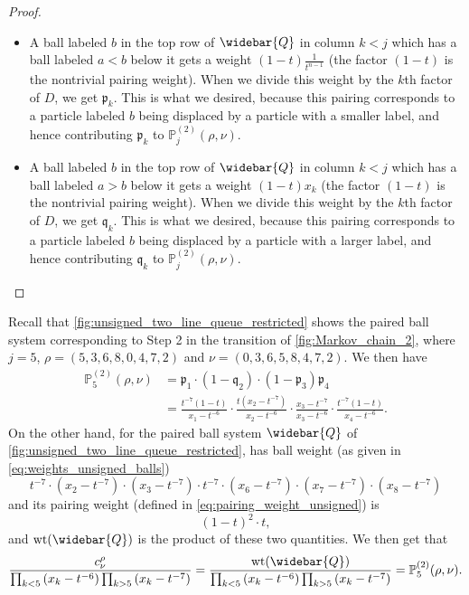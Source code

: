 \documentclass[12pt]{amsart}
\theoremstyle{definition}
\DeclareMathOperator{\wt}{wt}
\newcommand{\Qbar}{\widebar{Q}}
\newcommand{\PPtwo}[1]{\mathbb P^{(2)}_{#1}}
\newcommand{\mfp}{\mathfrak p}
\newcommand{\mfq}{\mathfrak q}
\begin{document}
\begin{proof}
\begin{itemize}
    $k$th factor of $D$, we get $1-\mfq_k$
    (see \eqref{eq:1minuspk}).
    This is what we desired, because such a trivial pairing corresponds to a particle labeled $b$ skipped over by a particle with a larger label, and hence contributes $1-\mfq_k$ to $\PPtwo{j}(\rho,\nu)$.
    \item A ball labeled $b$ in the top row of $\Qbar$ in column $k<j$ which has a ball labeled $a<b$ below it gets a weight $(1-t)\frac{1}{t^{n-1}}$    (the factor $(1-t)$ is the nontrivial pairing weight). When we divide this weight by the $k$th factor of $D$, we get $\mfp_k$.  This is what we desired, because this pairing corresponds to a particle labeled $b$ being displaced by a particle with a smaller label, and hence contributing $\mfp_k$ 
    to $\PPtwo{j}(\rho,\nu)$.
    \item A ball labeled $b$ in the top row of 
    $\Qbar$ in column $k<j$ which has a ball labeled $a>b$ below it gets a weight $(1-t)x_k$ (the factor $(1-t)$ is the nontrivial pairing weight). 
     When we divide this weight by the $k$th factor of $D$, we get $\mfq_k$.  This is what we desired, because this pairing
    corresponds to a particle labeled $b$ being displaced by a particle with a larger label, and hence contributing $\mfq_k$ to $\PPtwo{j}(\rho,\nu)$.\qedhere
\end{itemize}
\end{proof}


Recall that \cref{fig:unsigned_two_line_queue_restricted} shows the paired ball system corresponding to Step 2 in the transition of \cref{fig:Markov_chain_2}, where $j=5$, $\rho=(5,3,6,8,0,4,7,2)$ and $\nu=(0,3,6,5,8,4,7,2)$. We then have 
\begin{align*}
  \PPtwo{5}(\rho,\nu)&=\mfp_1\cdotp(1-\mfq_2)\cdotp(1-\mfp_3)\mfp_4\\
  &=\frac{t^{-7}(1-t)}{x_1-t^{-6}}\cdotp \frac{t (x_2-t^{-7})}{x_2-t^{-6}}\cdotp\frac{x_3-t^{-7}}{x_3-t^{-6}}\cdotp\frac{t^{-7}(1-t)}{x_4-t^{-6}}.
\end{align*}
On the other hand, for the paired ball system $\Qbar$ of \cref{fig:unsigned_two_line_queue_restricted}, has ball weight (as given in \cref{eq:weights_unsigned_balls}) 
$$t^{-7}\cdotp (x_2-t^{-7})\cdotp(x_3-t^{-7})\cdotp t^{-7}\cdotp (x_6-t^{-7})\cdotp (x_7-t^{-7}) \cdotp(x_8-t^{-7})$$
and its pairing weight (defined in \cref{eq:pairing_weight_unsigned}) is 
$$(1-t)^2\cdotp t,$$
and $\wt(\Qbar)$ is the product of these two quantities. We then get that
$$\frac{c^\rho_\nu}{\prod_{k<5}\left(x_k-t^{-6}\right)\prod_{k>5}\left(x_k-t^{-7}\right)}
=\frac{\wt(\Qbar)}{\prod_{k<5}\left(x_k-t^{-6}\right)\prod_{k>5}\left(x_k-t^{-7}\right)}=\PPtwo{5}(\rho,\nu).$$
\end{document}
